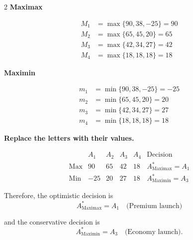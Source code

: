 {\begin{multicols}{2}
			\textbf{Maximax}
			
			\[
			\begin{array}{ll}
				M_1 &= \max\{90,38,-25\}=90\\
				M_2 &= \max\{65,45,20\}=65\\
				M_3 &= \max\{42,34,27\}=42\\
				M_4 &= \max\{18,18,18\}=18
			\end{array}
			\]
			
			\textbf{Maximin}
			
			\[
			\begin{array}{ll}
				m_1 &= \min\{90,38,-25\}=-25\\
				m_2 &= \min\{65,45,20\}=20\\
				m_3 &= \min\{42,34,27\}=27\\
				m_4 &= \min\{18,18,18\}=18
			\end{array}
			\]
			
			\columnbreak
			
			\textbf{Replace the letters with their values.}
			
			\[
			\begin{array}{c|ccccc}
				& A_1 & A_2 & A_3 & A_4 & \text{Decision}\\
				\hline
				\text{Max} &
				90 & 65 & 42 & 18 &
				A^*_{\mathrm{Maximax}}=A_1
				\\
				\text{Min} &
				-25 & 20 & 27 & 18 &
				A^*_{\mathrm{Maximin}}=A_3
			\end{array}
			\]
			
			Therefore, the optimistic decision is
			\[
			A^*_{\mathrm{Maximax}}=A_1
			\quad\text{(Premium launch)}
			\]
			
			and the conservative decision is
			\[
			A^*_{\mathrm{Maximin}}=A_3
			\quad\text{(Economy launch)}.
			\]
			
		\end{multicols}
		
	}
	
